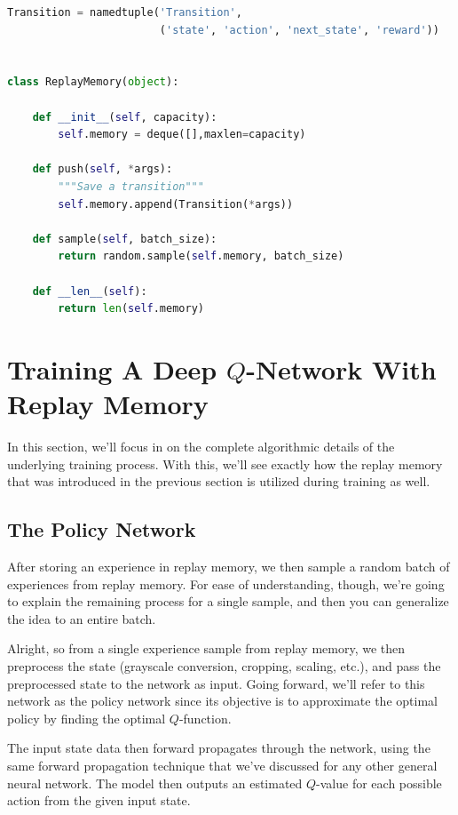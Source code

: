 \begin{lstlisting}[language=Python]
Transition = namedtuple('Transition',
                        ('state', 'action', 'next_state', 'reward'))


class ReplayMemory(object):

    def __init__(self, capacity):
        self.memory = deque([],maxlen=capacity)

    def push(self, *args):
        """Save a transition"""
        self.memory.append(Transition(*args))

    def sample(self, batch_size):
        return random.sample(self.memory, batch_size)

    def __len__(self):
        return len(self.memory)
\end{lstlisting}


%
\section{Training A Deep $Q$-Network With Replay Memory}
%


In this section, we'll focus in on the complete algorithmic details of the underlying 
training process. With this, we'll see exactly how the replay memory that was introduced 
in the previous section is utilized during training as well.


\subsection{The Policy Network}

After storing an experience in replay memory, we then sample a random batch of experiences 
from replay memory. For ease of understanding, though, we're going to explain the remaining 
process for a single sample, and then you can generalize the idea to an entire batch.

Alright, so from a single experience sample from replay memory, we then preprocess the 
state (grayscale conversion, cropping, scaling, etc.), and pass the preprocessed state to 
the network as input. Going forward, we'll refer to this network as the policy network 
since its objective is to approximate the optimal policy by finding the optimal 
$Q$-function.

The input state data then forward propagates through the network, using the same forward 
propagation technique that we've discussed for any other general neural network. The model 
then outputs an estimated $Q$-value for each possible action from the given input state.

